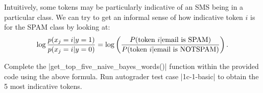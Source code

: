 \item {}
Intuitively, some tokens may be particularly indicative of an SMS being
in a particular class.  We can try to get an informal sense of how indicative
token $i$ is for the SPAM class by looking at:
\begin{equation*}
  \log \frac{p(x_j = i\vert  y=1)}{p(x_j = i\vert y=0)}
  = \log\left(\frac{P(\hbox{token $i$} \vert  \hbox{email is SPAM})}
    {P(\hbox{token $i$} \vert  \hbox{email is NOTSPAM})}\right).
\end{equation*}

Complete the |get_top_five_naive_bayes_words()| function within the provided code using the above formula.  Run autograder test case |1c-1-basic| to obtain the 5 most indicative tokens.
